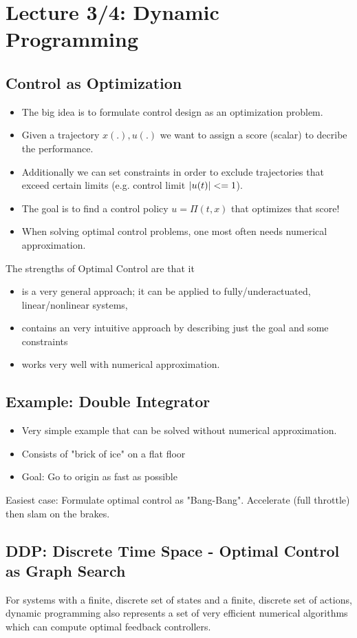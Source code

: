 \chapter{Lecture 3/4: Dynamic Programming}\label{lecture3}
\section{Control as Optimization}
\begin{itemize}
\item The big idea is to formulate control design as an optimization problem.
\item Given a trajectory $x(.),u(.)$ we want to assign a score (scalar) to decribe the performance.
\item Additionally we can set constraints in order to exclude trajectories that exceed certain limits (e.g. control limit $\lvert u(t)\rvert<=1$).
\item The goal is to find a control policy $u=\Pi(t,x)$ that optimizes that score!
\item When solving optimal control problems, one most often needs numerical approximation.
\end{itemize}
The strengths of Optimal Control are that it
\begin{itemize}
\item is a very general approach; it can be applied to fully/underactuated, linear/nonlinear systems,
\item contains an very intuitive approach by describing just the goal and some constraints 
\item works very well with numerical approximation.

\end{itemize}
 
 
\section{Example: Double Integrator}\begin{itemize}
\item Very simple example that can be solved without numerical approximation.
\item Consists of "brick of ice" on a flat floor
\item Goal: Go to origin as fast as possible
\end{itemize}
Easiest case: Formulate optimal control as "Bang-Bang". Accelerate (full throttle) then slam on the brakes.


\section{DDP: Discrete Time Space - Optimal Control as Graph Search}
For systems with a finite, discrete set of states and a finite, discrete set of actions, dynamic programming also represents a set of very efficient numerical algorithms which can compute optimal feedback controllers.

